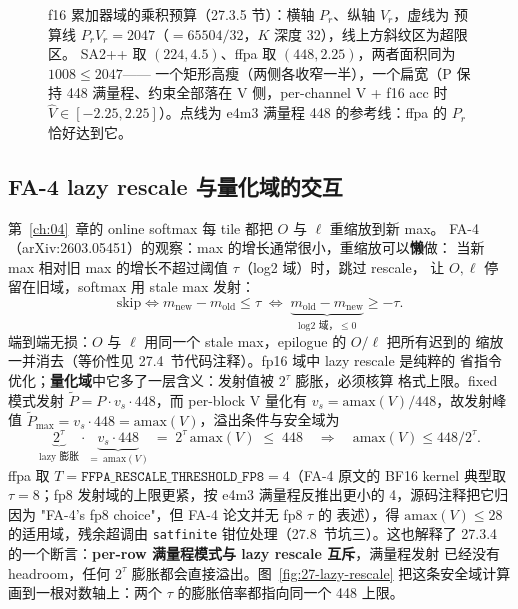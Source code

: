 \begin{figure}[H]
\caption{f16 累加器域的乘积预算（27.3.5 节）：横轴 $P_r$、纵轴 $V_r$，虚线为
预算线 $P_r V_r = 2047$（$=65504/32$，$K$ 深度 32），线上方斜纹区为超限区。
SA2++ 取 $(224,4.5)$、ffpa 取 $(448,2.25)$，两者面积同为 $1008\le2047$——
一个矩形高瘦（两侧各收窄一半），一个扁宽（P 保持 448 满量程、约束全部落在
V 侧，per-channel V + f16 acc 时 $\hat V\in[-2.25,2.25]$）。点线为 e4m3 满量程
448 的参考线：ffpa 的 $P_r$ 恰好达到它。}
\label{fig:27-pvbudget}
\end{figure}

\subsection{FA-4 lazy rescale 与量化域的交互}

第~\ref{ch:04}~章的 online softmax 每 tile 都把 $O$ 与 $\ell$ 重缩放到新 max。
FA-4（arXiv:2603.05451）的观察：max 的增长通常很小，重缩放可以\textbf{懒}做：
当新 max 相对旧 max 的增长不超过阈值 $\tau$（log2 域）时，跳过 rescale，
让 $O,\ell$ 停留在旧域，softmax 用 stale max 发射：
\begin{equation}
  \text{skip} \iff m_{\mathrm{new}} - m_{\mathrm{old}} \le \tau
  \;\Longleftrightarrow\;
  \underbrace{m_{\mathrm{old}} - m_{\mathrm{new}}}_{\text{log2 域，}\le 0}
  \ge -\tau .
  \label{eq:27-lazy}
\end{equation}
端到端无损：$O$ 与 $\ell$ 用同一个 stale max，epilogue 的 $O/\ell$ 把所有迟到的
缩放一并消去（等价性见 27.4~节代码注释）。fp16 域中 lazy rescale 是纯粹的
省指令优化；\textbf{量化域}中它多了一层含义：发射值被 $2^{\tau}$ 膨胀，必须核算
格式上限。fixed 模式发射 $\tilde{P} = P \cdot v_s \cdot 448$，而 per-block V
量化有 $v_s = \mathrm{amax}(V)/448$，故发射峰值
$\tilde{P}_{\max} = v_s \cdot 448 = \mathrm{amax}(V)$，溢出条件与安全域为
\begin{equation}
  \underbrace{2^{\tau}}_{\text{lazy 膨胀}} \cdot
  \underbrace{v_s \cdot 448}_{=\ \mathrm{amax}(V)}
  \;=\; 2^{\tau}\,\mathrm{amax}(V)
  \;\le\; 448
  \quad\Longrightarrow\quad
  \mathrm{amax}(V) \le 448/2^{\tau}.
  \label{eq:27-overflow}
\end{equation}
ffpa 取 $T = \texttt{FFPA\_RESCALE\_THRESHOLD\_FP8} = 4$（FA-4 原文的 BF16
kernel 典型取 $\tau = 8$；fp8 发射域的上限更紧，按 e4m3 满量程反推出更小的
4，源码注释把它归因为 "FA-4's fp8 choice"，但 FA-4 论文并无 fp8 $\tau$ 的
表述），得 $\mathrm{amax}(V) \le 28$
的适用域，残余超调由 \texttt{satfinite} 钳位处理（27.8~节坑三）。这也解释了
27.3.4 的一个断言：\textbf{per-row 满量程模式与 lazy rescale 互斥}，满量程发射
已经没有 headroom，任何 $2^{\tau}$ 膨胀都会直接溢出。图~\ref{fig:27-lazy-rescale}
把这条安全域计算画到一根对数轴上：两个 $\tau$ 的膨胀倍率都指向同一个 448 上限。

